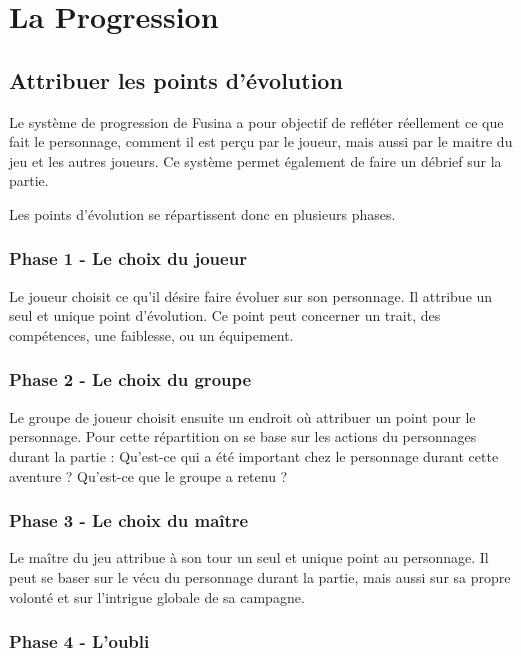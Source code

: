 \chapter{La Progression}

\section{Attribuer les points d'évolution}

Le système de progression de Fusina a pour objectif de refléter réellement ce que fait le personnage, comment il est perçu par le joueur, mais aussi par le maitre du jeu et les autres joueurs. Ce système permet également de faire un débrief sur la partie.

Les points d'évolution se répartissent donc en plusieurs phases.
\subsection{Phase 1 - Le choix du joueur}

Le joueur choisit ce qu'il désire faire évoluer sur son personnage. Il attribue un seul et unique point d'évolution. Ce point peut concerner un trait, des compétences, une faiblesse, ou un équipement.

\subsection{Phase 2 - Le choix du groupe}

Le groupe de joueur choisit ensuite un endroit où attribuer un point pour le personnage. Pour cette répartition on se base sur les actions du personnages durant la partie : Qu'est-ce qui a été important chez le personnage durant cette aventure ? Qu'est-ce que le groupe a retenu ?

\subsection{Phase 3 - Le choix du maître}

Le maître du jeu attribue à son tour un seul et unique point au personnage. Il peut se baser sur le vécu du personnage durant la partie, mais aussi sur sa propre volonté et sur l'intrigue globale de sa campagne.

\subsection{Phase 4 - L'oubli}


